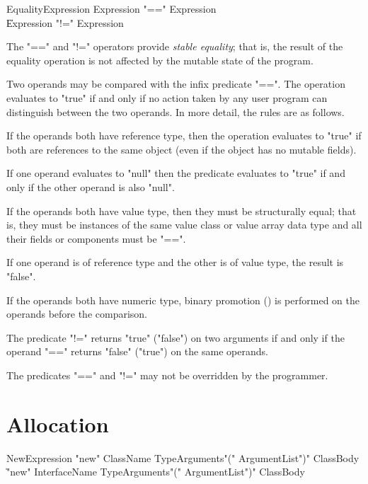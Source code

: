 \begin{grammar}
EqualityExpression \: Expression \xcd"==" Expression \\
\| Expression \xcd"!=" Expression \\
\end{grammar}

The \xcd"==" and \xcd"!=" operators provide \emph{stable
equality}; that is, the result of the equality operation is not affected
by the mutable state of the program.

Two operands may be compared with the infix predicate \xcd"==".
The operation
evaluates to \xcd"true" if and only if no action taken by any
user program can distinguish between the two operands.  In more detail,
the rules are as follows.

If the operands both have reference type, then the operation
evaluates to \xcd"true" if both are references to
the same object (even if the object has no mutable fields). 

If one operand evaluates to \xcd"null" then the predicate
evaluates to \xcd"true" if and only if the
other operand is also \xcd"null".

If the operands both have value type, then they must be structurally equal;
that is, they must be instances of the same value class or value array
data type and all their fields or components must be \xcd"==". 

If one operand is of reference type and the other is of value type,
the result is \xcd"false".

If the operands both have numeric type, binary promotion
() is performed on the operands before the
comparison.

The predicate \xcd"!=" returns \xcd"true" (\xcd"false") on two
arguments if and only if the operand \xcd"==" returns \xcd"false"
(\xcd"true") on the same operands.

The predicates \xcd"==" and \xcd"!=" may not be overridden by the
programmer.

\section{Allocation}
\label{ClassCreation}

\begin{grammar}
NewExpression \: \xcd"new" ClassName TypeArguments\opt \xcd"(" ArgumentList\opt \xcd")"
        ClassBody\opt \\
  \| \xcd"new" InterfaceName TypeArguments\opt \xcd"(" ArgumentList\opt \xcd")"
        ClassBody
\end{grammar}

